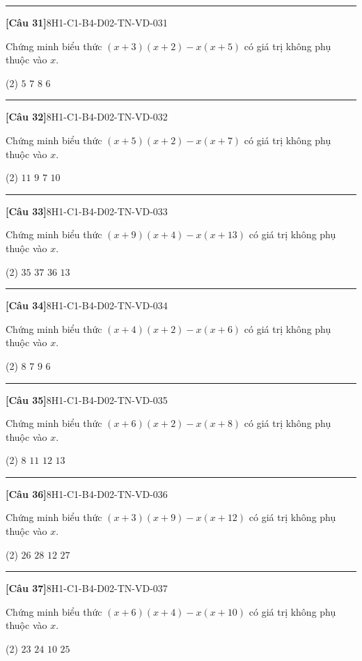 \documentclass[12pt,a4paper]{article}
\newif\ifloigiai
\newenvironment{cauhoi}[2]{%
  \par\medskip\noindent\rule{\textwidth}{0.4pt}\par\nopagebreak
  \noindent\textbf{[#1]}\hfill{\scriptsize\ttfamily #2}\par\nopagebreak\smallskip}{\par}
\newcommand{\dapan}[1]{\ifloigiai\par\smallskip\noindent\textit{Đáp án:} \textbf{#1}\par\fi}
\begin{document}
\begin{cauhoi}{Câu 31}{8H1-C1-B4-D02-TN-VD-031}
Chứng minh biểu thức $(x+3)(x+2)-x(x+5)$ có giá trị không phụ thuộc vào $x$.
\begin{tasks}(2)
\task $5$
\task $7$
\task $8$
\task $6$
\end{tasks}
\dapan{D}
\end{cauhoi}
\begin{cauhoi}{Câu 32}{8H1-C1-B4-D02-TN-VD-032}
Chứng minh biểu thức $(x+5)(x+2)-x(x+7)$ có giá trị không phụ thuộc vào $x$.
\begin{tasks}(2)
\task $11$
\task $9$
\task $7$
\task $10$
\end{tasks}
\dapan{D}
\end{cauhoi}
\begin{cauhoi}{Câu 33}{8H1-C1-B4-D02-TN-VD-033}
Chứng minh biểu thức $(x+9)(x+4)-x(x+13)$ có giá trị không phụ thuộc vào $x$.
\begin{tasks}(2)
\task $35$
\task $37$
\task $36$
\task $13$
\end{tasks}
\dapan{C}
\end{cauhoi}
\begin{cauhoi}{Câu 34}{8H1-C1-B4-D02-TN-VD-034}
Chứng minh biểu thức $(x+4)(x+2)-x(x+6)$ có giá trị không phụ thuộc vào $x$.
\begin{tasks}(2)
\task $8$
\task $7$
\task $9$
\task $6$
\end{tasks}
\dapan{A}
\end{cauhoi}
\begin{cauhoi}{Câu 35}{8H1-C1-B4-D02-TN-VD-035}
Chứng minh biểu thức $(x+6)(x+2)-x(x+8)$ có giá trị không phụ thuộc vào $x$.
\begin{tasks}(2)
\task $8$
\task $11$
\task $12$
\task $13$
\end{tasks}
\dapan{C}
\end{cauhoi}
\begin{cauhoi}{Câu 36}{8H1-C1-B4-D02-TN-VD-036}
Chứng minh biểu thức $(x+3)(x+9)-x(x+12)$ có giá trị không phụ thuộc vào $x$.
\begin{tasks}(2)
\task $26$
\task $28$
\task $12$
\task $27$
\end{tasks}
\dapan{D}
\end{cauhoi}
\begin{cauhoi}{Câu 37}{8H1-C1-B4-D02-TN-VD-037}
Chứng minh biểu thức $(x+6)(x+4)-x(x+10)$ có giá trị không phụ thuộc vào $x$.
\begin{tasks}(2)
\task $23$
\task $24$
\task $10$
\task $25$
\end{tasks}
\dapan{B}
\end{cauhoi}
\end{document}
